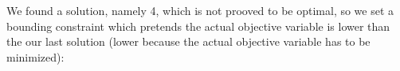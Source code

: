 \documentclass[10pt,a4paper]{article}
\begin{document}
We found a solution, namely 4, which is not prooved to be optimal, so we set a
bounding constraint which pretends the actual objective variable is lower than
the our last solution (lower because the actual objective variable has to be
minimized):

\pagebreak
\end{document}
